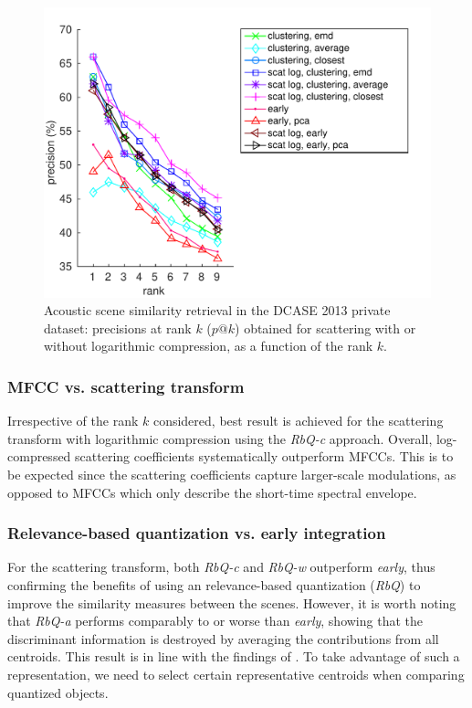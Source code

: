 \documentclass[smallextended]{svjour3}
\makeatletter
\newcommand*{\vs}{vs.\@\xspace}
\makeatother
\begin{document}
\begin{figure}[t]
\begin{center}
\includegraphics[width=\columnwidth]{figures/log}
\caption{Acoustic scene similarity retrieval in the DCASE 2013 private dataset: precisions at rank $k$ ($p@k$) obtained for scattering with or without logarithmic compression, as a function of the rank $k$.}
\label{fig:ASS_0}
\end{center}
\end{figure}

\subsubsection*{MFCC \vs scattering transform}

Irrespective of the rank $k$ considered, best result is achieved for the scattering transform with logarithmic compression using the \emph{RbQ-c} approach. Overall, log-compressed scattering coefficients systematically outperform MFCCs. This is to be expected since the scattering coefficients capture larger-scale modulations, as opposed to MFCCs which only describe the short-time spectral envelope.

\subsubsection*{Relevance-based quantization \vs early integration}

For the scattering transform, both \emph{RbQ-c} and \emph{RbQ-w} outperform \emph{early}, thus confirming the benefits of using an relevance-based quantization (\emph{RbQ}) to improve the similarity measures between the scenes. However, it is worth noting that \emph{RbQ-a} performs comparably to or worse than \emph{early}, showing that the discriminant information is destroyed by averaging the contributions from all centroids. This result is in line with the findings of \cite{lagrange:hal-01082501}. To take advantage of such a representation, we need to select certain representative centroids when comparing quantized objects.
\end{document}
